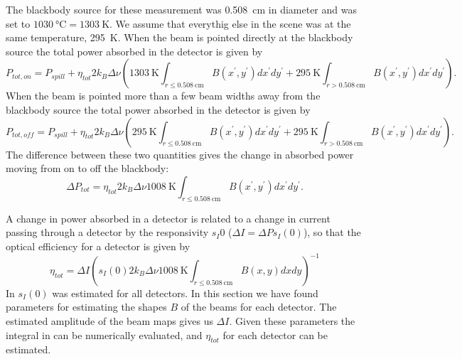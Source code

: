 The blackbody source for these measurement was \SI{0.508}{\cm} in diameter and was set to $\SI{1030}{\celsius} = \SI{1303}{\kelvin}$.
We assume that everythig else in the scene was at the same temperature, \SI{295}{\kelvin}.
When the beam is pointed directly at the blackbody source the total power absorbed in the detector is given by
\begin{equation}
  P_{tot,on} = P_{spill} + \eta_{tot} 2 k_B \Delta \nu \left( \SI{1303}{\kelvin} \int_{r \leq \SI{0.508}{\cm}} B(x^{\prime}, y^{\prime}) dx^{\prime} dy^{\prime} + 
                                                       \SI{295}{\kelvin} \int_{r > \SI{0.508}{\cm}} B(x^{\prime}, y^{\prime}) dx^{\prime} dy^{\prime}
                                                \right).
\end{equation}
When the beam is pointed more than a few beam widths away from the blackbody source the total power absorbed in the detector is given by
\begin{equation}
  P_{tot,off} = P_{spill} + \eta_{tot} 2 k_B \Delta \nu \left( \SI{295}{\kelvin} \int_{r \leq \SI{0.508}{\cm}} B(x^{\prime}, y^{\prime}) dx^{\prime} dy^{\prime} + 
                                                       \SI{295}{\kelvin} \int_{r > \SI{0.508}{\cm}} B(x^{\prime}, y^{\prime}) dx^{\prime} dy^{\prime}
                                                \right).
\end{equation}
The difference between these two quantities gives the change in absorbed power moving from on to off the blackbody:
\begin{equation}
  \Delta P_{tot} = \eta_{tot} 2 k_B \Delta \nu \SI{1008}{\kelvin} \int_{r \leq \SI{0.508}{\cm}} B(x^{\prime}, y^{\prime}) dx^{\prime} dy^{\prime}.
\end{equation}

A change in power absorbed in a detector is related to a change in current passing through a detector by the responsivity $s_I{0}$ ($\Delta I = \Delta P s_I(0)$), so that the optical efficiency for a detector is given by
\begin{equation}\label{eqn:opt-eff-from-beams}
  \eta_{tot} = \Delta I \left( s_I(0) 2 k_B \Delta \nu \SI{1008}{\K} \int_{r \leq \SI{0.508}{\cm}} B(x,y) dx dy \right)^{-1}
\end{equation}
In  $s_I(0)$ was estimated for all detectors.
In this section we have found parameters for estimating the shapes $B$ of the beams for each detector.
The estimated amplitude of the beam maps gives us $\Delta I$.
Given these parameters the integral in  can be numerically evaluated, and $\eta_{tot}$ for each detector can be estimated.


